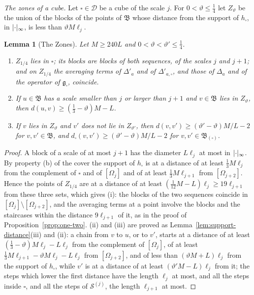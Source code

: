 \documentclass[11pt]{preprint}
\DeclarePairedDelimiter{\abs}{\lvert}{\rvert}
\numberwithin{equation}{section}
\newtheorem{lemma}[theorem]{Lemma}
\theoremstyle{definition}
\theoremstyle{remark}
\theoremstyle{plain}
\begin{document}
\emph{The zones of a cube.} Let $\square \in \mathscr D$ be a cube of the scale $j$. For $0 < \vartheta \leq \frac14$ let $Z_\vartheta$ be the union of the blocks of the points of $\mathfrak B$ whose distance from the support of $h_\square$, in $\abs\cdot_\infty$, is less than $\vartheta M\ell_j$.

\begin{lemma}[The Zones]\label{lem:zones}
Let $M \geq 240L$ and $0 < \vartheta < \vartheta' \leq \frac14$.
\begin{enumerate}[label=(\roman*)]
\item $Z_{1/4}$ lies in $\square$; its blocks are blocks of both sequences, of the scales $j$ and $j + 1$; and on $Z_{1/4}$ the averaging terms of $\Delta'_a$ and of $\Delta'_{a,\square}$, and those of $\Delta_a$ and of the operator of $\mathfrak g_\square$, coincide.
\item If $u \in \mathfrak B$ has a scale smaller than $j$ or larger than $j + 1$ and $v \in \mathfrak B$ lies in $Z_\vartheta$, then $d(u, v) \geq (\frac13 - \vartheta)M - L$.
\item If $v$ lies in $Z_\vartheta$ and $v'$ does not lie in $Z_{\vartheta'}$, then $d(v, v') \geq (\vartheta' - \vartheta)M/L - 2$ for $v, v' \in \mathfrak B$, and $d_\square(v, v') \geq (\vartheta' - \vartheta)M/L - 2$ for $v, v' \in \mathfrak B_{(\square)}$.
\end{enumerate}
\end{lemma}

\begin{proof}
A block of a scale of at most $j + 1$ has the diameter $L\ell_j$ at most in $\abs\cdot_\infty$. By property (b) of the cover the support of $h_\square$ is at a distance of at least $\frac13M\ell_j$ from the complement of $\square$ and of $[\Omega_j]$ and of at least $\frac13M\ell_{j+1}$ from $[\Omega_{j+2}]$. Hence the points of $Z_{1/4}$ are at a distance of at least $(\frac{1}{12}M - L)\ell_j \geq 19\ell_{j+1}$ from these three sets, which gives (i): the blocks of the two sequences coincide in $[\Omega_j] \setminus [\Omega_{j+2}]$, and the averaging terms at a point involve the blocks and the staircases within the distance $9\ell_{j+1}$ of it, as in the proof of Proposition~\ref{prop:one-two}. (ii) and (iii) are proved as Lemma~\ref{lem:support-distance}(iii) and (ii): a chain from $v$ to $u$, or to $v'$, starts at a distance of at least $(\frac13 - \vartheta)M\ell_j - L\ell_j$ from the complement of $[\Omega_j]$, of at least $\frac13M\ell_{j+1} - \vartheta M\ell_j - L\ell_j$ from $[\Omega_{j+2}]$, and of less than $(\vartheta M + L)\ell_j$ from the support of $h_\square$, while $v'$ is at a distance of at least $(\vartheta'M - L)\ell_j$ from it; the steps which lower the first distance have the length $\ell_j$ at most, and all the steps inside $\square$, and all the steps of $\mathcal S^{(j)}$, the length $\ell_{j+1}$ at most.
\end{proof}
\end{document}
